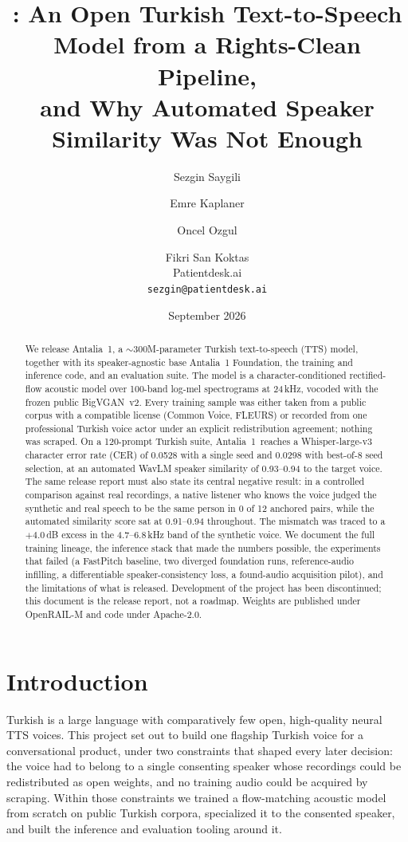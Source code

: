 \documentclass[10pt,twocolumn]{article}
\title{\antalia: An Open Turkish Text-to-Speech Model from a Rights-Clean Pipeline,\\
and Why Automated Speaker Similarity Was Not Enough}
\author{%
  Sezgin Saygili \and Emre Kaplaner \and Oncel Ozgul \and Fikri San Koktas\\[2pt]
  Patientdesk.ai\\
  \texttt{sezgin@patientdesk.ai}%
}
\date{September 2026}
\newcommand{\antalia}{Antalia~1}
\newcommand{\foundation}{Antalia~1 Foundation}
\begin{document}
\maketitle

\begin{abstract}
We release \antalia, a $\sim$300M-parameter Turkish text-to-speech (TTS) model, together with its speaker-agnostic base \foundation, the training and inference code, and an evaluation suite. The model is a character-conditioned rectified-flow acoustic model over 100-band log-mel spectrograms at 24\,kHz, vocoded with the frozen public BigVGAN~v2. Every training sample was either taken from a public corpus with a compatible license (Common Voice, FLEURS) or recorded from one professional Turkish voice actor under an explicit redistribution agreement; nothing was scraped. On a 120-prompt Turkish suite, \antalia\ reaches a Whisper-large-v3 character error rate (CER) of 0.0528 with a single seed and 0.0298 with best-of-8 seed selection, at an automated WavLM speaker similarity of 0.93--0.94 to the target voice. The same release report must also state its central negative result: in a controlled comparison against real recordings, a native listener who knows the voice judged the synthetic and real speech to be the same person in 0 of 12 anchored pairs, while the automated similarity score sat at 0.91--0.94 throughout. The mismatch was traced to a $+4.0$\,dB excess in the 4.7--6.8\,kHz band of the synthetic voice. We document the full training lineage, the inference stack that made the numbers possible, the experiments that failed (a FastPitch baseline, two diverged foundation runs, reference-audio infilling, a differentiable speaker-consistency loss, a found-audio acquisition pilot), and the limitations of what is released. Development of the project has been discontinued; this document is the release report, not a roadmap. Weights are published under OpenRAIL-M and code under Apache-2.0.
\end{abstract}

\section{Introduction}
\label{sec:intro}

Turkish is a large language with comparatively few open, high-quality neural TTS voices. This project set out to build one flagship Turkish voice for a conversational product, under two constraints that shaped every later decision: the voice had to belong to a single consenting speaker whose recordings could be redistributed as open weights, and no training audio could be acquired by scraping. Within those constraints we trained a flow-matching acoustic model from scratch on public Turkish corpora, specialized it to the consented speaker, and built the inference and evaluation tooling around it.
\end{document}
